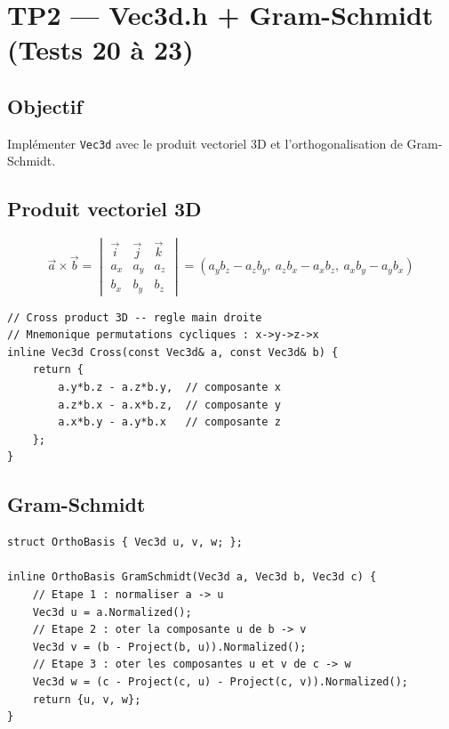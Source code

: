 \documentclass[12pt,a4paper]{report}
\begin{document}
\section{TP2 --- Vec3d.h + Gram-Schmidt (Tests 20 à 23)}

\subsection{Objectif}

Implémenter \texttt{Vec3d} avec le produit vectoriel 3D et
l'orthogonalisation de Gram-Schmidt.

\subsection{Produit vectoriel 3D}

\begin{equation}
    \vec{a} \times \vec{b} =
    \begin{vmatrix}
        \vec{i} & \vec{j} & \vec{k} \\
        a_x & a_y & a_z \\
        b_x & b_y & b_z
    \end{vmatrix}
    = (a_y b_z - a_z b_y,\ a_z b_x - a_x b_z,\ a_x b_y - a_y b_x)
\end{equation}

\begin{lstlisting}[caption={Vec3d.h --- Cross product}]
// Cross product 3D -- regle main droite
// Mnemonique permutations cycliques : x->y->z->x
inline Vec3d Cross(const Vec3d& a, const Vec3d& b) {
    return {
        a.y*b.z - a.z*b.y,  // composante x
        a.z*b.x - a.x*b.z,  // composante y
        a.x*b.y - a.y*b.x   // composante z
    };
}
\end{lstlisting}

\subsection{Gram-Schmidt}

\begin{lstlisting}[caption={Vec3d.h --- GramSchmidt}]
struct OrthoBasis { Vec3d u, v, w; };

inline OrthoBasis GramSchmidt(Vec3d a, Vec3d b, Vec3d c) {
    // Etape 1 : normaliser a -> u
    Vec3d u = a.Normalized();
    // Etape 2 : oter la composante u de b -> v
    Vec3d v = (b - Project(b, u)).Normalized();
    // Etape 3 : oter les composantes u et v de c -> w
    Vec3d w = (c - Project(c, u) - Project(c, v)).Normalized();
    return {u, v, w};
}
\end{lstlisting}
\end{document}
